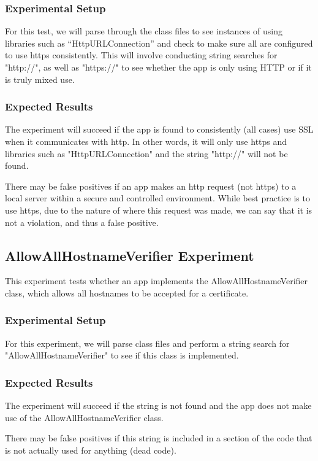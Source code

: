 \documentclass[10pt,twocolumn,pdftex]{article}
\begin{document}
    \subsubsection{Experimental Setup}
    For this test, we will parse through the class files to see instances of using libraries such as “HttpURLConnection” and check to make sure all are configured to use https consistently. This will involve conducting string searches for "http://", as well as "https://" to see whether the app is only using HTTP or if it is truly mixed use. 
    
    \subsubsection{Expected Results}
    The experiment will succeed if the app is found to consistently (all cases) use SSL when it communicates with http. In other words, it will only use https and libraries such as "HttpURLConnection" and the string "http://" will not be found. 
    
    There may be false positives if an app makes an http request (not https) to a local server within a secure and controlled environment. While best practice is to use https, due to the nature of where this request was made, we can say that it is not a violation, and thus a false positive.
    
    
\subsection{AllowAllHostnameVerifier Experiment}
    This experiment tests whether an app implements the AllowAllHostnameVerifier class, which allows all hostnames to be accepted for a certificate.
    
    \subsubsection{Experimental Setup}
    For this experiment, we will parse class files and perform a string search for "AllowAllHostnameVerifier" to see if this class is implemented.
    
    \subsubsection{Expected Results}
    The experiment will succeed if the string is not found and the app does not make use of the AllowAllHostnameVerifier class.
    
    There may be false positives if this string is included in a section of the code that is not actually used for anything (dead code).



\end{document}
